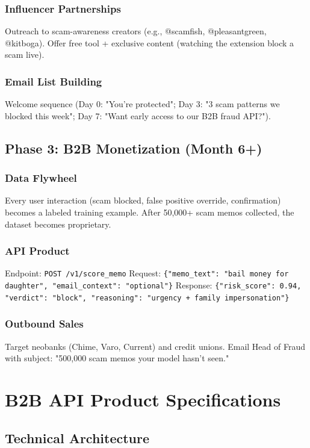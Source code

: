 \documentclass[12pt]{article}
\begin{document}
\subsubsection{Influencer Partnerships}
Outreach to scam-awareness creators (e.g., @scamfish, @pleasantgreen, @kitboga). Offer free tool + exclusive content (watching the extension block a scam live).

\subsubsection{Email List Building}
Welcome sequence (Day 0: "You're protected"; Day 3: "3 scam patterns we blocked this week"; Day 7: "Want early access to our B2B fraud API?").

\subsection{Phase 3: B2B Monetization (Month 6+)}

\subsubsection{Data Flywheel}
Every user interaction (scam blocked, false positive override, confirmation) becomes a labeled training example. After 50,000+ scam memos collected, the dataset becomes proprietary.

\subsubsection{API Product}
Endpoint: \texttt{POST /v1/score\_memo}
Request: \texttt{\{"memo\_text": "bail money for daughter", "email\_context": "optional"\}}
Response: \texttt{\{"risk\_score": 0.94, "verdict": "block", "reasoning": "urgency + family impersonation"\}}

\subsubsection{Outbound Sales}
Target neobanks (Chime, Varo, Current) and credit unions. Email Head of Fraud with subject: "500,000 scam memos your model hasn't seen."

\newpage
\section{B2B API Product Specifications}

\subsection{Technical Architecture}
\end{document}
